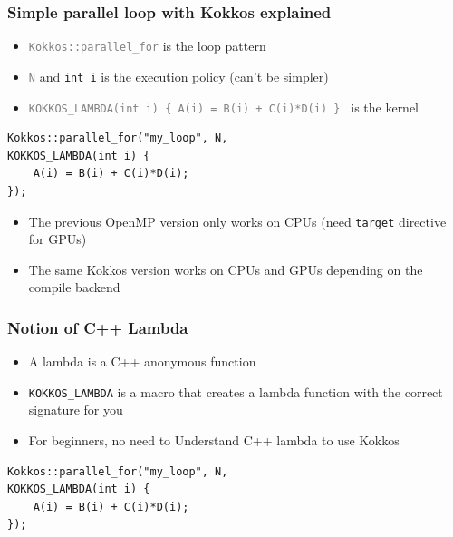 \documentclass[aspectratio=169]{beamer}
\begin{document}

\begin{frame}[fragile]
    \frametitle{Simple parallel loop with Kokkos explained} 

\normalsize
\begin{itemize}
    \item \textcolor{gray}{\texttt{Kokkos::parallel\_for}} is the loop pattern 
    \item \textcolor{gray}{\texttt{N}} and \texttt{int i} is the execution policy (can't be simpler)
    \item \textcolor{gray}{\texttt{KOKKOS\_LAMBDA(int i) \{ A(i) = B(i) + C(i)*D(i) \} }} is the kernel
\end{itemize}

\small
\begin{verbatim}
Kokkos::parallel_for("my_loop", N, 
KOKKOS_LAMBDA(int i) {
    A(i) = B(i) + C(i)*D(i);
});
\end{verbatim}

\begin{itemize}
    \item The previous OpenMP version only works on CPUs (need \texttt{target} directive for GPUs)
    \item The same Kokkos version works on CPUs and GPUs depending on the compile backend
\end{itemize}


\end{frame}


\begin{frame}[fragile]
    \frametitle{Notion of C++ Lambda} 

\begin{itemize}
    \item A lambda is a C++ anonymous function
    \item \texttt{KOKKOS\_LAMBDA} is a macro that creates a lambda function with the correct signature for you
    \item For beginners, no need to Understand C++ lambda to use Kokkos
\end{itemize}

\small
\begin{verbatim}
Kokkos::parallel_for("my_loop", N, 
KOKKOS_LAMBDA(int i) {
    A(i) = B(i) + C(i)*D(i);
});
\end{verbatim}

\end{frame}
\end{document}
